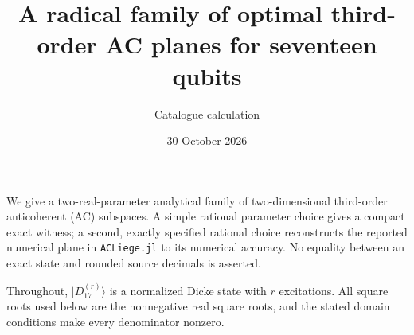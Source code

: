 \documentclass[11pt]{article}
\newcommand{\D}[1]{|D_{17}^{(#1)}\rangle}
\begin{document}
\title{A radical family of optimal third-order AC planes for seventeen qubits}
\author{Catalogue calculation}
\date{30 October 2026}
\maketitle
We give a two-real-parameter analytical family of two-dimensional third-order
anticoherent (AC) subspaces. A simple rational parameter choice gives a compact
exact witness; a second, exactly specified rational choice reconstructs the
reported numerical plane in \texttt{ACLiege.jl} to its numerical accuracy.
No equality between an exact state and rounded source decimals is asserted.

Throughout, $\D r$ is a normalized Dicke state with $r$ excitations.
All square roots used below are the nonnegative real square roots, and the
stated domain conditions make every denominator nonzero.
\end{document}
